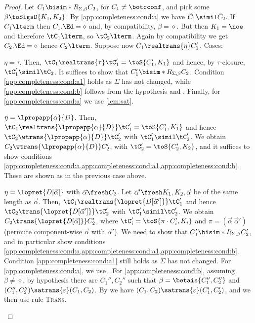 \begin{proof}
  Let $C_1\bisim*R_{\Sigma,\beta}C_2$, for $C_1\not=\botcconf$, and pick some $\beta\toSigsD{K_1,K_2}$.
By \cref{app:completeness:cond:a} we have $\tilde C_1\simil\tilde C_2$.
If $C_1\lterm$ then $C_1.\Ed=\diamond$ and, by compatibility, $\beta=\diamond$. But then $K_1=\noe$ and therefore $\tC_1\lterm$, so $\tC_2\lterm$. Again by compatibility we get $C_2.\Ed=\diamond$ hence $C_2\lterm$.
Suppose now $C_1\realtrans{\eta}C_1'$.
Cases:%
\begin{asparaitem}
\item $\eta=\tau$. Then, $\tC_1\realtrans{\tau}\tC_1'=\toS{C_1',K_1}$ and hence, by $\tau$-closure, $\tC_1'\simil \tC_2$.
  It suffices to show that $C_1'\bisim*R_{\Sigma,\beta}C_2$. Condition \cref{app:completeness:cond:a1} holds as $\Sigma$ has not changed, while \cref{app:completeness:cond:b}
 follows from the hypothesis and .
Finally, for \cref{app:completeness:cond:a} we use \cref{lem:sat}.
\item $\eta=\lpropapp{\alpha}{D}$. Then, $\tC_1\realtrans{\lpropapp{\alpha}{D}}\tC_1'=\toS{C_1',K_1}$ and hence
$\tC_2\wtrans{\lpropapp{\alpha}{D}}\tC_2'$ with
$\tC_1'\simil\tC_2'$. We obtain $C_2\wtrans{\lpropapp{\alpha}{D}}C_2'$, with $\tC_2'=\toS{C_2',K_2}$, and it suffices to show conditions \cref{app:completeness:cond:a,app:completeness:cond:a1,app:completeness:cond:b}.
These are shown as in the previous case above.
\item $\eta=\lopret{D[\vec\alpha]}$ with $\vec\alpha\fresh C_2$.
Let $\vec\alpha'\fresh K_1,K_2,\vec\alpha$ be of the same length as $\vec\alpha$.
  Then, $\tC_1\realtrans{\lopret{D[\vec\alpha']}}\tC_1'$ and hence
$\tC_2\trans{\lopret{D[\vec\alpha']}}\tC_2'$ with
$\tC_1'\simil\tC_2'$. We obtain $C_2\trans{\lopret{D[\vec\alpha]}}C_2'$,
where $\tC_i'=\toS{\pi\cdot C_i',K_i}$ and $\pi=(\vec \alpha\ \vec\alpha')$ (permute component-wise $\vec \alpha$ with $\vec\alpha'$).
We need to show that $C_1'\bisim*R_{\Sigma,\beta}C_2'$, and in particular
 show conditions \cref{app:completeness:cond:a,app:completeness:cond:a1,app:completeness:cond:b}. Condition \cref{app:completeness:cond:a1} still holds as $\Sigma$ has not changed. For \cref{app:completeness:cond:a}, we use . For \cref{app:completeness:cond:b}, assuming $\beta\neq\diamond$, by hypothesis there are $C_1'',C_2''$ such that $\beta=\betais{C_1'',C_2''}$ and $(C_1'',C_2'')\satrans{\varepsilon}(C_1,C_2)$. By  we have $( C_1, C_2)\satrans{\varepsilon}( C_1', C_2')$, and we then use rule \textsc{Trans}.

\end{asparaitem}
\end{proof}
